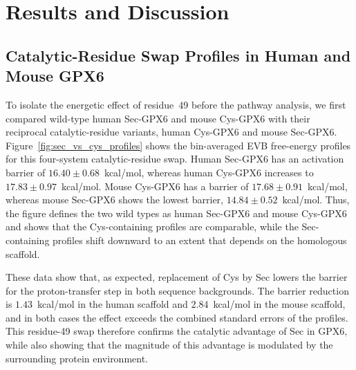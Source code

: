 \section{Results and Discussion}

\subsection{Catalytic-Residue Swap Profiles in Human and Mouse GPX6}

To isolate the energetic effect of residue~49 before the pathway analysis, we first compared wild-type human Sec-GPX6 and mouse Cys-GPX6 with their reciprocal catalytic-residue variants, human Cys-GPX6 and mouse Sec-GPX6. Figure~\ref{fig:sec_vs_cys_profiles} shows the bin-averaged EVB free-energy profiles for this four-system catalytic-residue swap. Human Sec-GPX6 has an activation barrier of $16.40 \pm 0.68$~kcal/mol, whereas human Cys-GPX6 increases to $17.83 \pm 0.97$~kcal/mol. Mouse Cys-GPX6 has a barrier of $17.68 \pm 0.91$~kcal/mol, whereas mouse Sec-GPX6 shows the lowest barrier, $14.84 \pm 0.52$~kcal/mol. Thus, the figure defines the two wild types as human Sec-GPX6 and mouse Cys-GPX6 and shows that the Cys-containing profiles are comparable, while the Sec-containing profiles shift downward to an extent that depends on the homologous scaffold.

 These data show that, as expected, replacement of Cys by Sec lowers the barrier for the proton-transfer step in both sequence backgrounds. The barrier reduction is $1.43$~kcal/mol in the human scaffold and $2.84$~kcal/mol in the mouse scaffold, and in both cases the effect exceeds the combined standard errors of the profiles. This residue-49 swap therefore confirms the catalytic advantage of Sec in GPX6, while also showing that the magnitude of this advantage is modulated by the surrounding protein environment. 

